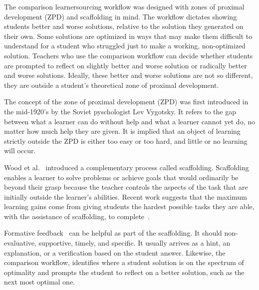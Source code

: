 


The comparison learnersourcing workflow was designed with zones of proximal development (ZPD) and scaffolding in mind. The workflow dictates showing students better and worse solutions, relative to the solution they generated on their own. Some solutions are optimized in ways that may make them difficult to understand for a student who struggled just to make a working, non-optimized solution. Teachers who use the comparison workflow can decide whether students are prompted to reflect on slightly better and worse solution or radically better and worse solutions. Ideally, these better and worse solutions are not so different, they are outside a student's theoretical zone of proximal development.

The concept of the zone of proximal development (ZPD) was first introduced in the mid-1920's by the Soviet pyschologist Lev Vygotsky. It refers to the gap between what a learner can do without help and what a learner cannot yet do, no matter how much help they are given. It is implied that an object of learning strictly outside the ZPD is either too easy or too hard, and little or no learning will occur.

Wood et al.~\cite{woodscaffolding} introduced a complementary process called scaffolding. Scaffolding enables a learner to solve problems or achieve goals that would ordinarily be beyond their grasp because the teacher controls the aspects of the task that are initially outside the learner's abilities. Recent work suggests that the maximum learning gains come from giving students the hardest possible tasks they are able, with the assistance of scaffolding, to complete~\cite{zpd14}. 

Formative feedback~\cite{formative} can be helpful as part of the scaffolding. It should non-evaluative, supportive, timely, and specific. It usually arrives as a hint, an explanation, or a verification based on the student answer. Likewise, the comparison workflow, identifies where a student solution is on the spectrum of optimality and prompts the student to reflect on a better solution, such as the next most optimal one.

